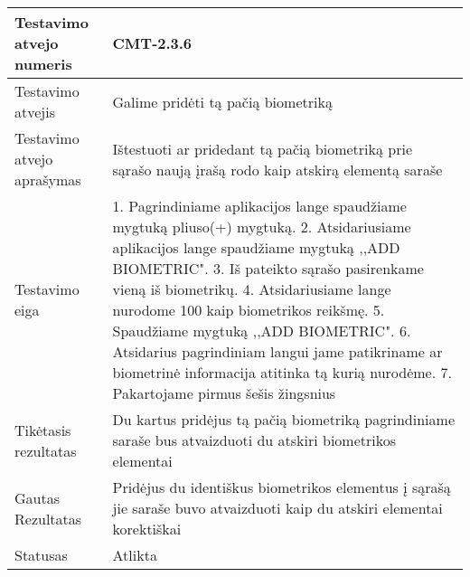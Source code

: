 \documentclass[oneside]{VUMIFPSkursinis}
\begin{document}
\begin{center}
    \begin{tabular}{ |p{5cm}|p{13cm}|}
    \hline
        Testavimo atvejo numeris &  CMT-2.3.6\\ \hline
        Testavimo atvejis & Galime pridėti tą pačią biometriką \\ \hline
        Testavimo atvejo aprašymas & Ištestuoti ar pridedant tą pačią biometriką prie sąrašo naują įrašą rodo kaip atskirą elementą saraše  \\ \hline
        Testavimo eiga &   1. Pagrindiniame aplikacijos lange spaudžiame mygtuką pliuso(+) mygtuką. 
				2. Atsidariusiame aplikacijos lange spaudžiame mygtuką ,,ADD BIOMETRIC". 
				3. Iš pateikto sąrašo pasirenkame vieną iš biometrikų. 
				4. Atsidariusiame lange nurodome 100 kaip biometrikos reikšmę.
				5. Spaudžiame mygtuką ,,ADD BIOMETRIC".
				6. Atsidarius pagrindiniam langui jame patikriname ar biometrinė informacija atitinka tą kurią nurodėme.
				7. Pakartojame pirmus šešis žingsnius\\ \hline
        Tikėtasis rezultatas &  Du kartus pridėjus tą pačią biometriką pagrindiniame saraše bus atvaizduoti du atskiri biometrikos elementai\\ \hline
        Gautas Rezultatas &  Pridėjus du identiškus biometrikos elementus į sąrašą jie saraše buvo atvaizduoti kaip du atskiri elementai korektiškai\\ \hline
        Statusas & Atlikta \\ \hline
    \hline
    \end{tabular}
\end{center}
\end{document}
